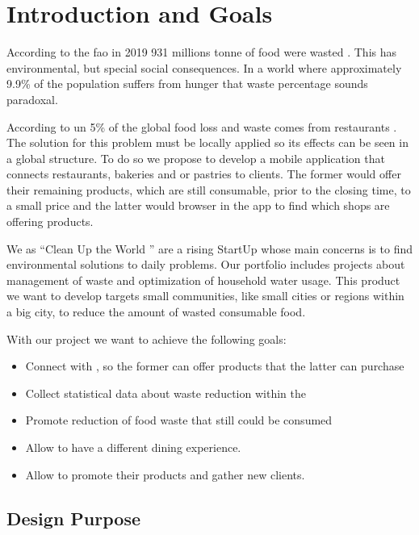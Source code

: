 \section{Introduction and Goals}

According to the \acrfull{fao} in 2019 931 millions tonne of food were wasted \cite{refart:FAOFW}. This has
environmental, but special social consequences. In a world where approximately 9.9\% of the \cite{refart:AAHWH}
population suffers from hunger that waste percentage sounds paradoxal.

According to \acrfull{un} 5\% of the global food loss and waste comes from restaurants \cite{refart:UNSP}. 
The solution for this problem must be locally applied so its effects can be seen in a global structure. To do 
so we propose to develop a mobile application that connects restaurants, bakeries and or pastries to clients. The
former would offer their remaining products, which are still consumable, prior to the closing time, to a small price
and the latter would browser in the app to find which shops are offering products. 

We as ``Clean Up the World \textregistered'' are a rising StartUp whose main concerns is to find environmental solutions to
daily problems. Our portfolio includes projects about management of waste and optimization of household water 
usage. This product we want to develop targets small communities, like small cities or regions within a big city, 
to reduce the amount of wasted consumable food.

With our project we want to achieve the following goals:

\begin{itemize}
    \item Connect  with , so the former can offer products that the latter
    can purchase
    \item Collect statistical data about waste reduction within the 
    \item Promote reduction of food waste that still could be consumed
    \item Allow  to have a different dining experience.
    \item Allow  to promote their products and gather new clients.
\end{itemize}

\subsection{Design Purpose}


